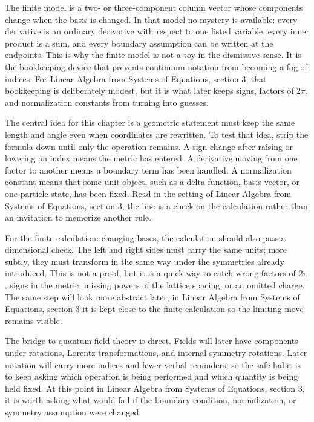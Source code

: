 The finite model is a two- or three-component column vector whose components change when the basis is changed.  In that model no mystery is available: every derivative is an ordinary derivative with respect to one listed variable, every inner product is a sum, and every boundary assumption can be written at the endpoints.  This is why the finite model is not a toy in the dismissive sense.  It is the bookkeeping device that prevents continuum notation from becoming a fog of indices.  For Linear Algebra from Systems of Equations, section 3, that bookkeeping is deliberately modest, but it is what later keeps signs, factors of \(2\pi\), and normalization constants from turning into guesses.

The central idea for this chapter is a geometric statement must keep the same length and angle even when coordinates are rewritten.  To test that idea, strip the formula down until only the operation remains.  A sign change after raising or lowering an index means the metric has entered.  A derivative moving from one factor to another means a boundary term has been handled.  A normalization constant means that some unit object, such as a delta function, basis vector, or one-particle state, has been fixed.  Read in the setting of Linear Algebra from Systems of Equations, section 3, the line is a check on the calculation rather than an invitation to memorize another rule.

For the finite calculation: changing bases, the calculation should also pass a dimensional check.  The left and right sides must carry the same units; more subtly, they must transform in the same way under the symmetries already introduced.  This is not a proof, but it is a quick way to catch wrong factors of \(2\pi\), signs in the metric, missing powers of the lattice spacing, or an omitted charge.  The same step will look more abstract later; in Linear Algebra from Systems of Equations, section 3 it is kept close to the finite calculation so the limiting move remains visible.

The bridge to quantum field theory is direct.  Fields will later have components under rotations, Lorentz transformations, and internal symmetry rotations.  Later notation will carry more indices and fewer verbal reminders, so the safe habit is to keep asking which operation is being performed and which quantity is being held fixed.  At this point in Linear Algebra from Systems of Equations, section 3, it is worth asking what would fail if the boundary condition, normalization, or symmetry assumption were changed.


